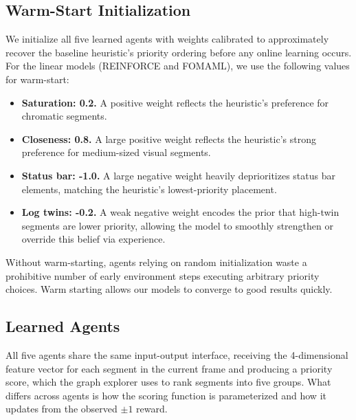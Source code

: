 \documentclass{article}
\begin{document}
\subsection{Warm-Start Initialization}

We initialize all five learned agents with weights calibrated to approximately recover the baseline heuristic's priority ordering before any online learning occurs. \\
For the linear models (REINFORCE and FOMAML), we use the following values for warm-start:
\begin{itemize}
    \item \textbf{Saturation: 0.2.} A positive weight reflects the heuristic's preference for chromatic segments.
    \item \textbf{Closeness: 0.8.} A large positive weight reflects the heuristic's strong preference for medium-sized visual segments.
    \item \textbf{Status bar: -1.0.} A large negative weight heavily deprioritizes status bar elements, matching the heuristic's lowest-priority placement.
    \item \textbf{Log twins: -0.2.} A weak negative weight encodes the prior that high-twin segments are lower priority, allowing the model to smoothly strengthen or override this belief via experience.
\end{itemize}

Without warm-starting, agents relying on random initialization waste a prohibitive number of early environment steps executing arbitrary priority choices. Warm starting allows our models to converge to good results quickly.

\subsection{Learned Agents}

All five agents share the same input-output interface, receiving the 4-dimensional feature vector for each segment in the current frame and producing a priority score, which the graph explorer uses to rank segments into five groups. What differs across agents is how the scoring function is parameterized and how it updates from the observed $\pm 1$ reward.
\end{document}
